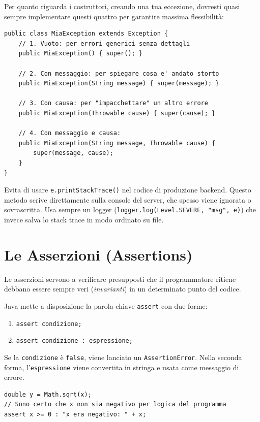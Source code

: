 Per quanto riguarda i costruttori, creando una tua eccezione, dovresti quasi sempre implementare questi quattro per garantire massima flessibilità:

\begin{lstlisting}[caption={I 4 costruttori "canonici" di un'eccezione}]
public class MiaException extends Exception {
    // 1. Vuoto: per errori generici senza dettagli
    public MiaException() { super(); }

    // 2. Con messaggio: per spiegare cosa e' andato storto
    public MiaException(String message) { super(message); }

    // 3. Con causa: per "impacchettare" un altro errore
    public MiaException(Throwable cause) { super(cause); }

    // 4. Con messaggio e causa:
    public MiaException(String message, Throwable cause) {
        super(message, cause);
    }
}
\end{lstlisting}

\begin{tip}
Evita di usare \texttt{e.printStackTrace()} nel codice di produzione backend. Questo metodo scrive direttamente sulla console del server, che spesso viene ignorata o sovrascritta. Usa sempre un logger (\texttt{logger.log(Level.SEVERE, "msg", e)}) che invece salva lo stack trace in modo ordinato su file.
\end{tip}

\section{Le Asserzioni (Assertions)}

Le asserzioni servono a verificare presupposti che il programmatore ritiene debbano essere sempre veri (\textit{invarianti}) in un determinato punto del codice. 

Java mette a disposizione la parola chiave \texttt{assert} con due forme:

\begin{enumerate}
    \item \texttt{assert condizione;}
    \item \texttt{assert condizione : espressione;}
\end{enumerate}

Se la \texttt{condizione} è \texttt{false}, viene lanciato un \texttt{AssertionError}. Nella seconda forma, l'\texttt{espressione} viene convertita in stringa e usata come messaggio di errore.

\begin{lstlisting}[caption={Esempio di utilizzo delle asserzioni}]
double y = Math.sqrt(x);
// Sono certo che x non sia negativo per logica del programma
assert x >= 0 : "x era negativo: " + x;
\end{lstlisting}

